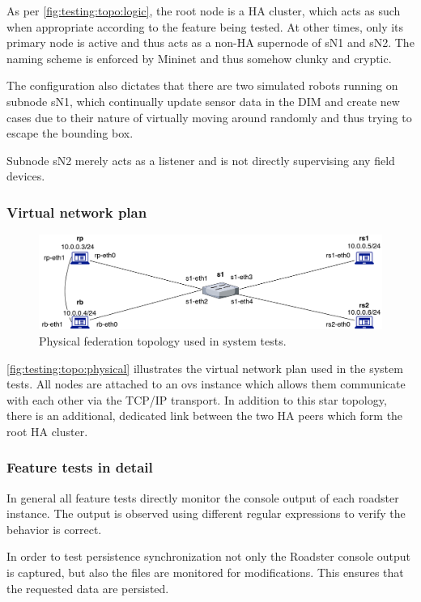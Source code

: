 As per \autoref{fig:testing:topo:logic}, the root node is a HA cluster, which
acts as such when appropriate according to
the feature being tested. At other times, only its primary node is active and
thus acts as a non-HA supernode of sN1 and sN2. The naming scheme is enforced
by Mininet and thus somehow clunky and cryptic.

The configuration also dictates that there are two simulated robots running on
subnode sN1, which continually update sensor data in the DIM and create new
cases due to their nature of virtually moving around randomly and thus trying
to escape the bounding box.

Subnode sN2 merely acts as a listener and is not directly supervising any field
devices.

\subsubsection{Virtual network plan}
\begin{figure}[]
	\center
	\includegraphics[width=\textwidth]{img/physical_network_mininet.pdf}
	\caption{Physical federation topology used in system tests.}
	\label{fig:testing:topo:physical}
\end{figure}

\autoref{fig:testing:topo:physical} illustrates the virtual network plan used in the system tests.
All nodes are attached to an \gls{ovs} instance which allows them communicate with each
other via the TCP/IP transport. In addition to this star topology, there is an
additional, dedicated link between the two HA peers which form the root HA
cluster.

\subsubsection{Feature tests in detail}
In general all feature tests directly monitor the console output of each roadster instance.
The output is observed using different regular expressions to verify the behavior is correct.

In order to test persistence synchronization not only the Roadster console output is captured, 
but also the files are monitored for modifications. This ensures that the requested data
are persisted.

